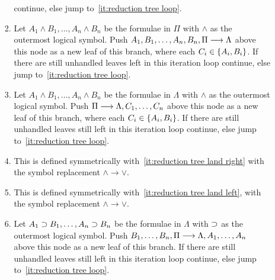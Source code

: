 \documentclass[11pt,a4paper]{article}
\begin{document}
\begin{definition}
\begin{enumerate}
\begin{enumerate}
\begin{enumerate}
                            continue, else jump to~\ref{it:reduction tree loop}.
                        \item\label{it:reduction tree land left}
                            Let \(A_1\land B_1,\ldots,A_n\land B_n\) be the formulae
                            in \(\Pi\) with \(\land\) as the outermost logical symbol.
                            Push \(A_1, B_1,\ldots,A_n, B_n,\Pi\longrightarrow\Lambda\) above
                            this node as a new leaf of this branch,
                            where each \(C_i\in\{A_i, B_i\}\).
                            If there are still unhandled leaves left in this iteration loop
                            continue, else jump to~\ref{it:reduction tree loop}.
                        \item\label{it:reduction tree land right}
                            Let \(A_1\land B_1,\ldots,A_n\land B_n\) be the formulae
                            in \(\Lambda\) with \(\land\) as the outermost logical symbol.
                            Push \(\Pi\longrightarrow\Lambda,C_1,\ldots,C_n\) above
                            this node as a new leaf of this branch,
                            where each \(C_i\in\{A_i, B_i\}\).
                            If there are still unhandled leaves still left in this iteration loop
                            continue, else jump to~\ref{it:reduction tree loop}.
                        \item\label{it:reduction tree lor left}
                            This is defined symmetrically with~\ref{it:reduction tree land right}
                            with the symbol replacement \(\land\to\lor\).
                        \item\label{it:reduction tree lor right}
                            This is defined symmetrically with~\ref{it:reduction tree land left},
                            with the symbol replacement \(\land\to\lor\).
                        \item\label{it:reduction tree limplies lef}
                            Let \(A_1\supset B_1,\ldots,A_n\supset B_n\) be the formulae
                            in \(\Lambda\) with \(\supset\) as the outermost logical symbol.
                            Push \(B_1,\ldots,B_n,\Pi\longrightarrow\Lambda, A_1, \ldots, A_n\) above
                            this node as a new leaf of this branch.
                            If there are still unhandled leaves still left in this iteration loop
                            continue, else jump to~\ref{it:reduction tree loop}.

\end{enumerate}
\end{enumerate}
\end{enumerate}
\end{definition}
\end{document}
